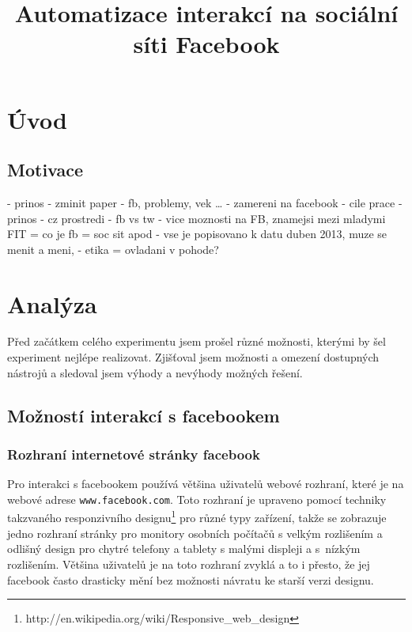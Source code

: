 \documentclass[thesis=M,czech]{FITthesis}[2013/05/10]
\title{Automatizace interakcí na sociální síti Facebook}
\begin{document}


\chapter{{\' U}vod}
\section{Motivace}
- prinos
- zminit paper
- fb, problemy, vek …
- zamereni na facebook
- cile prace
- prinos
- cz prostredi
- fb vs tw - vice moznosti na FB, znamejsi mezi mladymi
FIT
= co je fb = soc sit apod
- vse je popisovano k datu duben 2013, muze se menit a meni,
- etika = ovladani v pohode?


\chapter{Analýza}

Před začátkem celého experimentu jsem prošel různé možnosti, kterými by šel experiment nejlépe realizovat. Zjišťoval jsem možnosti a omezení dostupných nástrojů a sledoval jsem výhody a nevýhody možných řešení. 

\section{Možností interakcí s facebookem}

\subsection{Rozhraní internetové stránky facebook}
Pro interakci s facebookem používá většina uživatelů webové rozhraní, které je na webové adrese \verb|www.facebook.com|. Toto rozhraní je upraveno pomocí techniky takzvaného responzivního designu\footnote{http://en.wikipedia.org/wiki/Responsive\_web\_design} pro různé typy zařízení, takže se zobrazuje jedno rozhraní stránky pro monitory osobních počítačů s velkým rozlišením a odlišný design pro chytré telefony a tablety s malými displeji a s~nízkým rozlišením. Většina uživatelů je na toto rozhraní zvyklá a to i přesto, že jej facebook často drasticky mění bez možnosti návratu ke starší verzi designu. 
\end{document}
